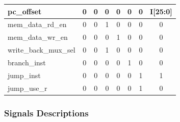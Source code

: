 \documentclass{article}
\begin{document}
\begin{landscape}
\begin{table}[htp]
\begin{center}
\begin{tabular}{|l|c|c|c|c|c|c|c|}
        pc\_offset            & 0         & 0         & 0         & 0         & 0         & 0         & I[25:0] \\ \hline
        mem\_data\_rd\_en     & 0         & 0         & 1         & 0         & 0         & 0         & 0 \\ \hline
        mem\_data\_wr\_en     & 0         & 0         & 0         & 1         & 0         & 0         & 0 \\ \hline
        write\_back\_mux\_sel & 0         & 0         & 1         & 0         & 0         & 0         & 0 \\ \hline
        branch\_inst          & 0         & 0         & 0         & 0         & 1         & 0         & 0 \\ \hline
        jump\_inst            & 0         & 0         & 0         & 0         & 0         & 1         & 1 \\ \hline
        jump\_use\_r          & 0         & 0         & 0         & 0         & 0         & 1         & 0 \\ \hline
      \end{tabular}
    \end{center}
  \end{table}
 
  \end{landscape}
  
  \subsubsection{Signals Descriptions}
\end{document}
